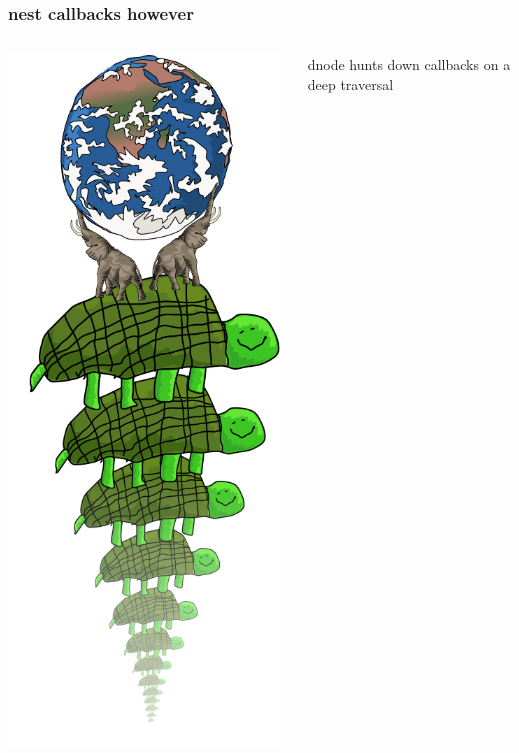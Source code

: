\documentclass{beamer}
\begin{document}
\begin{frame}
    \frametitle{nest callbacks however}
    \begin{columns}[c]
        \includegraphics[scale=0.28]{images/all_the_way_down.png}
        \begin{center}
        \fbox{}
        \newline
        
        \pause
        \huge
        dnode hunts down callbacks on a deep traversal
        
        \end{center}
    \end{columns}
\end{frame}
\end{document}
